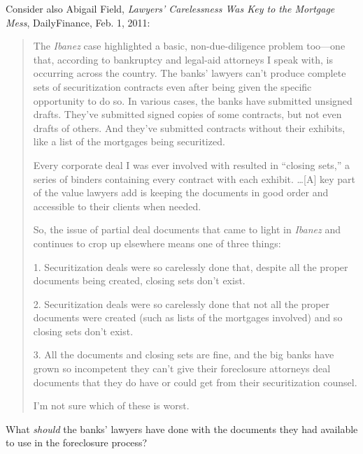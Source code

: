 \item Consider also Abigail Field, \textit{Lawyers' Carelessness Was Key to the
Mortgage Mess}, DailyFinance, Feb. 1, 2011:
\begin{quote}
The \textit{Ibanez} case highlighted a basic, non-due-diligence problem
too---one that, according to bankruptcy and legal-aid attorneys I speak with,
is occurring across the country. The banks' lawyers can't produce complete sets
of securitization contracts even after being given the specific opportunity to
do so. In various cases, the banks have submitted unsigned drafts. They've
submitted signed copies of some contracts, but not even drafts of others. And
they've submitted contracts without their exhibits, like a list of the
mortgages being securitized.

Every corporate deal I was ever involved with resulted in ``closing sets,'' a
series of binders containing every contract with each exhibit. \dots [A] key
part of the value lawyers add is keeping the documents in good order and
accessible to their clients when needed.

So, the issue of partial deal documents that came to light in \textit{Ibanez}
and continues to crop up elsewhere means one of three things:

1. Securitization deals were so carelessly done that, despite all the proper
documents being created, closing sets don't exist.

2. Securitization deals were so carelessly done that not all the proper
documents were created (such as lists of the mortgages involved) and so closing
sets don't exist.

3. All the documents and closing sets are fine, and the big banks have grown so
incompetent they can't give their foreclosure attorneys deal documents that
they do have or could get from their securitization counsel.

I'm not sure which of these is worst.
\end{quote}
What \textit{should} the banks' lawyers have done with the documents they had
available to use in the foreclosure process? 



